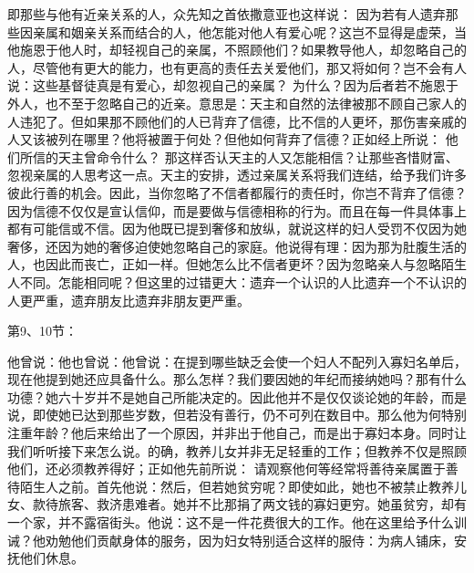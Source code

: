 即那些与他有近亲关系的人，众先知之首依撒意亚也这样说：  因为若有人遗弃那些因亲属和姻亲关系而结合的人，他怎能对他人有爱心呢？这岂不显得是虚荣，当他施恩于他人时，却轻视自己的亲属，不照顾他们？如果教导他人，却忽略自己的人，尽管他有更大的能力，也有更高的责任去关爱他们，那又将如何？岂不会有人说：这些基督徒真是有爱心，却忽视自己的亲属？ 为什么？因为后者若不施恩于外人，也不至于忽略自己的近亲。意思是：天主和自然的法律被那不顾自己家人的人违犯了。但如果那不顾他们的人已背弃了信德，比不信的人更坏，那伤害亲戚的人又该被列在哪里？他将被置于何处？但他如何背弃了信德？正如经上所说：  他们所信的天主曾命令什么？  那这样否认天主的人又怎能相信？让那些吝惜财富、忽视亲属的人思考这一点。天主的安排，透过亲属关系将我们连结，给予我们许多彼此行善的机会。因此，当你忽略了不信者都履行的责任时，你岂不背弃了信德？因为信德不仅仅是宣认信仰，而是要做与信德相称的行为。而且在每一件具体事上都有可能信或不信。因为他既已提到奢侈和放纵，就说这样的妇人受罚不仅因为她奢侈，还因为她的奢侈迫使她忽略自己的家庭。他说得有理：因为那为肚腹生活的人，也因此而丧亡，正如一样。但她怎么比不信者更坏？因为忽略亲人与忽略陌生人不同。怎能相同呢？但这里的过错更大：遗弃一个认识的人比遗弃一个不认识的人更严重，遗弃朋友比遗弃非朋友更严重。\par

第9、10节：\par

他曾说：他也曾说：他曾说：在提到哪些缺乏会使一个妇人不配列入寡妇名单后，现在他提到她还应具备什么。那么怎样？我们要因她的年纪而接纳她吗？那有什么功德？她六十岁并不是她自己所能决定的。因此他并不是仅仅谈论她的年龄，而是说，即使她已达到那些岁数，但若没有善行，仍不可列在数目中。那么他为何特别注重年龄？他后来给出了一个原因，并非出于他自己，而是出于寡妇本身。同时让我们听听接下来怎么说。的确，教养儿女并非无足轻重的工作；但教养不仅是照顾他们，还必须教养得好；正如他先前所说：  请观察他何等经常将善待亲属置于善待陌生人之前。首先他说：然后，但若她贫穷呢？即使如此，她也不被禁止教养儿女、款待旅客、救济患难者。她并不比那捐了两文钱的寡妇更穷。她虽贫穷，却有一个家，并不露宿街头。他说：这不是一件花费很大的工作。他在这里给予什么训诫？他劝勉他们贡献身体的服务，因为妇女特别适合这样的服侍：为病人铺床，安抚他们休息。\par

